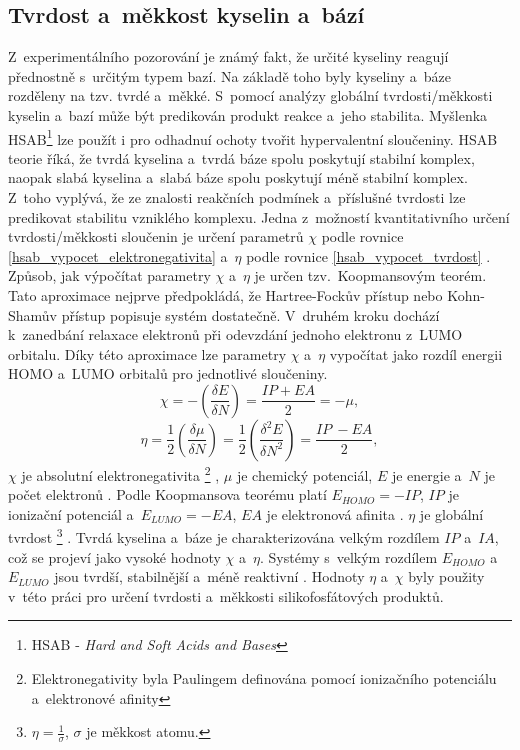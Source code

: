 \documentclass[
digital, %
table,   %
lof,     %
lot,     %
oneside,
]{fithesis3}
\begin{document}
\subsection{Tvrdost a~měkkost kyselin a~bází}
Z~experimentálního pozorování je známý fakt, že určité kyseliny reagují přednostně s~určitým typem bazí. Na základě toho byly kyseliny a~báze rozděleny na tzv. tvrdé a~měkké. S~pomocí analýzy globální tvrdosti/měkkosti kyselin a~bazí může být predikován produkt reakce a~jeho stabilita. Myšlenka HSAB\footnote{HSAB - \textit{Hard and Soft Acids and Bases}} lze použít i pro odhadnuí ochoty tvořit hypervalentní sloučeniny. HSAB teorie říká, že tvrdá kyselina a~tvrdá báze spolu poskytují stabilní komplex, naopak slabá kyselina a~slabá báze spolu poskytují méně stabilní komplex. Z~toho vyplývá, že ze znalosti reakčních podmínek a~příslušné tvrdosti lze predikovat stabilitu vzniklého komplexu. Jedna z~možností kvantitativního určení tvrdosti/měkkosti sloučenin je určení parametrů $\chi$ podle rovnice \ref{hsab_vypocet_elektronegativita} a~$\eta$ podle rovnice \ref{hsab_vypocet_tvrdost} \cite{hsabclanek}. Způsob, jak výpočítat parametry $\chi$ a~$\eta$ je určen tzv.~Koopmansovým teorém. Tato aproximace nejprve předpokládá, že Hartree-Fockův přístup nebo Kohn-Shamův přístup popisuje systém dostatečně. V~druhém kroku dochází k~zanedbání relaxace elektronů při odevzdání jednoho elektronu z~LUMO orbitalu. Díky této aproximace lze parametry $\chi$ a~$\eta$ vypočítat jako rozdíl energii HOMO a~LUMO orbitalů pro jednotlivé sloučeniny.
\begin{equation}
\chi = - \left( \frac{\delta E}{\delta N} \right) = \frac{IP + EA}{2} = -\mu,
\label{hsab_vypocet_elektronegativita}
\end{equation}
\begin{equation}
\eta = \frac{1}{2} \left( \frac{\delta \mu}{\delta N} \right) = \frac{1}{2}\left( \frac{\delta^2 E}{\delta N^2} \right) = \frac{IP~- EA}{2},
\label{hsab_vypocet_tvrdost}
\end{equation}
$\chi$ je absolutní elektronegativita  \footnote{Elektronegativity byla Paulingem definována pomocí ionizačního potenciálu a~elektronové afinity} , $\mu$ je chemický potenciál, $E$ je energie a~$N$ je počet elektronů \cite{hsabwatoc}. Podle Koopmansova teorému platí $E_{HOMO} = - IP$, $IP$ je ionizační potenciál a~$E_{LUMO} = -EA$, $EA$ je elektronová afinita \cite{kratochvilexcerpta}. $\eta$ je globální tvrdost \footnote{$\eta = \frac{1}{\sigma}$, $\sigma$ je měkkost atomu.} \cite{pearson1986absolute}. Tvrdá kyselina a~báze je charakterizována velkým rozdílem $IP$ a~$IA$, což se projeví jako vysoké hodnoty $\chi$ a~$\eta$. Systémy s~velkým rozdílem $E_{HOMO}$ a~$E_{LUMO}$ jsou tvrdší, stabilnější a~méně reaktivní \cite{hsabwatoc}. Hodnoty $\eta$ a~$\chi$ byly použity v~této práci pro určení tvrdosti a~měkkosti silikofosfátových produktů.\\
\end{document}
